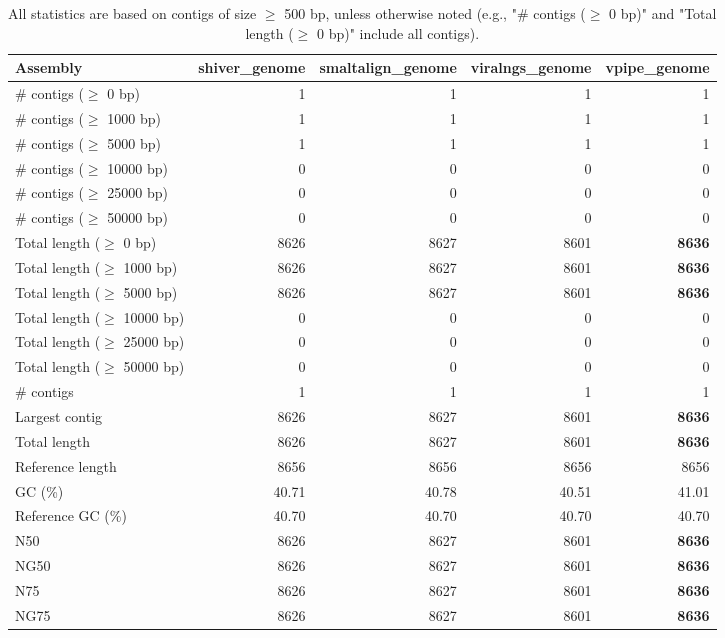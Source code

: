 \documentclass[12pt,a4paper]{article}
\begin{document}
\begin{table}[ht]
\begin{center}
\caption{All statistics are based on contigs of size $\geq$ 500 bp, unless otherwise noted (e.g., "\# contigs ($\geq$ 0 bp)" and "Total length ($\geq$ 0 bp)" include all contigs).}
\begin{tabular}{|l*{4}{|r}|}
\hline
Assembly & shiver\_genome & smaltalign\_genome & viralngs\_genome & vpipe\_genome \\ \hline
\# contigs ($\geq$ 0 bp) & 1 & 1 & 1 & 1 \\ \hline
\# contigs ($\geq$ 1000 bp) & 1 & 1 & 1 & 1 \\ \hline
\# contigs ($\geq$ 5000 bp) & 1 & 1 & 1 & 1 \\ \hline
\# contigs ($\geq$ 10000 bp) & 0 & 0 & 0 & 0 \\ \hline
\# contigs ($\geq$ 25000 bp) & 0 & 0 & 0 & 0 \\ \hline
\# contigs ($\geq$ 50000 bp) & 0 & 0 & 0 & 0 \\ \hline
Total length ($\geq$ 0 bp) & 8626 & 8627 & 8601 & {\bf 8636} \\ \hline
Total length ($\geq$ 1000 bp) & 8626 & 8627 & 8601 & {\bf 8636} \\ \hline
Total length ($\geq$ 5000 bp) & 8626 & 8627 & 8601 & {\bf 8636} \\ \hline
Total length ($\geq$ 10000 bp) & 0 & 0 & 0 & 0 \\ \hline
Total length ($\geq$ 25000 bp) & 0 & 0 & 0 & 0 \\ \hline
Total length ($\geq$ 50000 bp) & 0 & 0 & 0 & 0 \\ \hline
\# contigs & 1 & 1 & 1 & 1 \\ \hline
Largest contig & 8626 & 8627 & 8601 & {\bf 8636} \\ \hline
Total length & 8626 & 8627 & 8601 & {\bf 8636} \\ \hline
Reference length & 8656 & 8656 & 8656 & 8656 \\ \hline
GC (\%) & 40.71 & 40.78 & 40.51 & 41.01 \\ \hline
Reference GC (\%) & 40.70 & 40.70 & 40.70 & 40.70 \\ \hline
N50 & 8626 & 8627 & 8601 & {\bf 8636} \\ \hline
NG50 & 8626 & 8627 & 8601 & {\bf 8636} \\ \hline
N75 & 8626 & 8627 & 8601 & {\bf 8636} \\ \hline
NG75 & 8626 & 8627 & 8601 & {\bf 8636} \\ \hline

\end{tabular}
\end{center}
\end{table}
\end{document}
